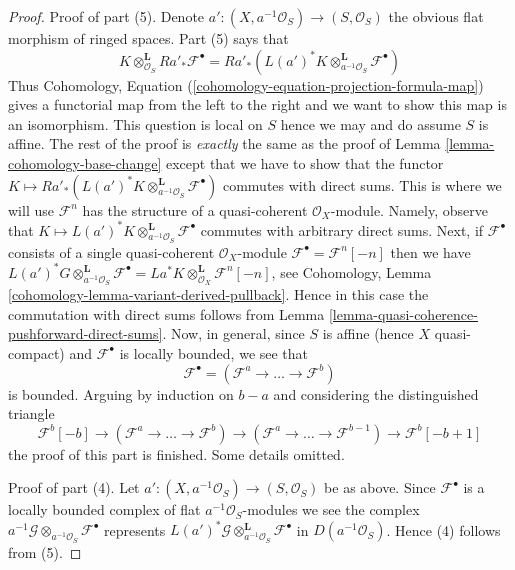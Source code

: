 \documentclass{stacks-project}
\theoremstyle{plain}
\theoremstyle{definition}
\theoremstyle{remark}
\numberwithin{equation}{subsection}
\begin{document}
\begin{proof}
\medskip\noindent
Proof of part (5). Denote
$a' : (X, a^{-1}\mathcal{O}_S) \to (S, \mathcal{O}_S)$
the obvious flat morphism of ringed spaces. Part (5) says that
$$
K \otimes_{\mathcal{O}_S}^\mathbf{L} Ra'_*\mathcal{F}^\bullet =
Ra'_*(L(a')^*K \otimes_{a^{-1}\mathcal{O}_S}^\mathbf{L}
\mathcal{F}^\bullet)
$$
Thus
Cohomology, Equation (\ref{cohomology-equation-projection-formula-map})
gives a functorial map from the left to the right and we want to show
this map is an isomorphism.
This question is local on $S$ hence we may and do assume $S$
is affine. The rest of the proof is {\it exactly} the same as the
proof of Lemma \ref{lemma-cohomology-base-change} except that we have
to show that the functor
$K \mapsto Ra'_*(L(a')^*K \otimes_{a^{-1}\mathcal{O}_S}^\mathbf{L}
\mathcal{F}^\bullet)$ commutes with direct sums.
This is where we will use $\mathcal{F}^n$ has the structure
of a quasi-coherent $\mathcal{O}_X$-module. Namely, observe that
$K \mapsto L(a')^*K
\otimes_{a^{-1}\mathcal{O}_S}^\mathbf{L} \mathcal{F}^\bullet$
commutes with arbitrary direct sums. Next, if
$\mathcal{F}^\bullet$ consists of a single quasi-coherent
$\mathcal{O}_X$-module $\mathcal{F}^\bullet = \mathcal{F}^n[-n]$
then we have $L(a')^*G
\otimes_{a^{-1}\mathcal{O}_S}^\mathbf{L} \mathcal{F}^\bullet =
La^*K \otimes_{\mathcal{O}_X}^\mathbf{L} \mathcal{F}^n[-n]$, see
Cohomology, Lemma \ref{cohomology-lemma-variant-derived-pullback}.
Hence in this case the commutation with direct sums follows from
Lemma \ref{lemma-quasi-coherence-pushforward-direct-sums}.
Now, in general, since $S$ is affine (hence $X$ quasi-compact)
and $\mathcal{F}^\bullet$ is locally bounded, we see that
$$
\mathcal{F}^\bullet = (\mathcal{F}^a \to \ldots \to \mathcal{F}^b)
$$
is bounded. Arguing by induction on $b - a$ and considering the
distinguished triangle
$$
\mathcal{F}^b[-b] \to (\mathcal{F}^a \to \ldots \to \mathcal{F}^b)
\to (\mathcal{F}^a \to \ldots \to \mathcal{F}^{b - 1}) \to
\mathcal{F}^b[-b + 1]
$$
the proof of this part is finished. Some details omitted.

\medskip\noindent
Proof of part (4). Let $a' : (X, a^{-1}\mathcal{O}_S) \to (S, \mathcal{O}_S)$
be as above. Since $\mathcal{F}^\bullet$ is a locally bounded
complex of flat $a^{-1}\mathcal{O}_S$-modules we see the complex
$a^{-1}\mathcal{G} \otimes_{a^{-1}\mathcal{O}_S} \mathcal{F}^\bullet$
represents $L(a')^*\mathcal{G}
\otimes_{a^{-1}\mathcal{O}_S}^\mathbf{L}
\mathcal{F}^\bullet$ in $D(a^{-1}\mathcal{O}_S)$. Hence (4)
follows from (5).
\end{proof}
\end{document}
